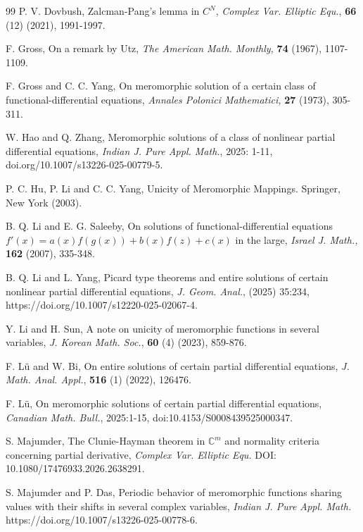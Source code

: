 \documentclass[11pt,reqno]{amsart}
\numberwithin{equation}{section}
\begin{document}
\begin{thebibliography}{99}
 {\sc P. V. Dovbush}, Zalcman-Pang's lemma in $C^N$, \textit{Complex Var. Elliptic Equ.}, \textbf{66} (12) (2021), 1991-1997.

 {\sc F. Gross}, On a remark by Utz, \textit{The American Math. Monthly,} \textbf{74} (1967), 1107-1109.	
	
 {\sc F. Gross} and {\sc C. C. Yang}, On meromorphic solution of a certain class of functional-differential equations, \textit{Annales Polonici Mathematici,} \textbf{27} (1973), 305-311.	
	
 {\sc W. Hao} and {\sc Q. Zhang}, Meromorphic solutions of a class of nonlinear partial differential equations, \textit{Indian J. Pure Appl. Math.}, 2025: 1-11, doi.org/10.1007/s13226-025-00779-5.

 {\sc P. C. Hu}, {\sc P. Li} and {\sc C. C. Yang}, Unicity of Meromorphic Mappings. Springer, New York (2003).

 {\sc B. Q. Li} and {\sc E. G. Saleeby}, On solutions of functional-differential equations $f'(x)=a(x)f(g(x))+b(x)f(z)+c(x)$ in the large, \textit{Israel J. Math.,} \textbf{162} (2007), 335-348. 
	

 {\sc B. Q. Li} and {\sc L. Yang}, Picard type theorems and entire solutions of certain nonlinear partial differential equations, \textit{J. Geom. Anal.}, (2025) 35:234, https://doi.org/10.1007/s12220-025-02067-4.

 {\sc Y. Li} and {\sc H. Sun}, A note on unicity of meromorphic functions in several variables, \textit{J. Korean Math. Soc.}, \textbf{60} (4) (2023), 859-876.


 {\sc F. L\"{u}} and {\sc W. Bi}, On entire solutions of certain partial differential equations, \textit{J. Math. Anal. Appl.}, \textbf{516} (1) (2022), 126476.

 {\sc F. L\"{u}}, On meromorphic solutions of certain partial differential equations, \textit{Canadian Math. Bull.}, 2025:1-15, doi:10.4153/S0008439525000347.

 {\sc S. Majumder}, The Clunie-Hayman theorem in $\mathbb{C}^m$ and normality criteria concerning partial derivative, \textit{Complex Var. Elliptic Equ.} DOI: 10.1080/17476933.2026.2638291.


 {\sc S. Majumder} and {\sc P. Das}, Periodic behavior of meromorphic functions sharing values with their shifts in several complex variables, \textit{Indian J. Pure Appl. Math.} https://doi.org/10.1007/s13226-025-00778-6.


\end{thebibliography}
\end{document}

